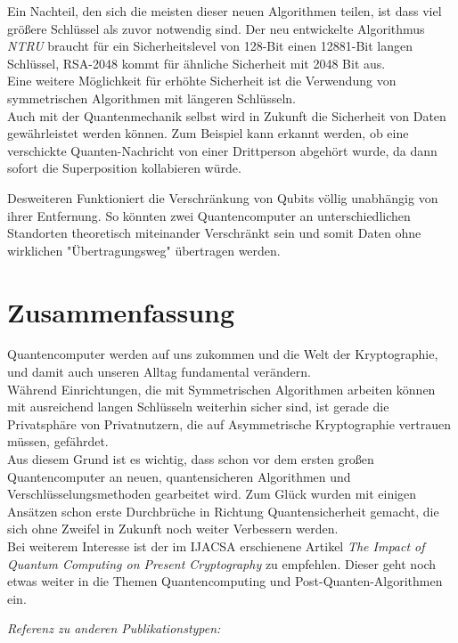 \documentclass[12pt]{article}
\begin{document}
Ein Nachteil, den sich die meisten dieser neuen Algorithmen teilen, ist dass viel größere Schlüssel als zuvor notwendig sind. Der neu entwickelte Algorithmus \textit{NTRU} braucht für ein Sicherheitslevel von 128-Bit einen 12881-Bit langen Schlüssel, RSA-2048 kommt für ähnliche Sicherheit mit 2048 Bit aus. \\
Eine weitere Möglichkeit für erhöhte Sicherheit ist die Verwendung von symmetrischen Algorithmen mit längeren Schlüsseln. \\

Auch mit der Quantenmechanik selbst wird in Zukunft die Sicherheit von Daten gewährleistet werden können. Zum Beispiel kann erkannt werden, ob eine verschickte Quanten-Nachricht von einer Drittperson abgehört wurde, da dann sofort die Superposition kollabieren würde.

Desweiteren Funktioniert die Verschränkung von Qubits völlig unabhängig von ihrer Entfernung. So könnten zwei Quantencomputer an unterschiedlichen Standorten theoretisch miteinander Verschränkt sein und somit Daten ohne wirklichen "Übertragungsweg" übertragen werden. \cite{mavroeidis2018impact}

\clearpage
\section{Zusammenfassung}

Quantencomputer werden auf uns zukommen und die Welt der Kryptographie, und damit auch unseren Alltag fundamental verändern. \\

Während Einrichtungen, die mit Symmetrischen Algorithmen arbeiten können mit ausreichend langen Schlüsseln weiterhin sicher sind, ist gerade die Privatsphäre von Privatnutzern, die auf Asymmetrische Kryptographie vertrauen müssen, gefährdet. \\

Aus diesem Grund ist es wichtig, dass schon vor dem ersten großen Quantencomputer an neuen, quantensicheren Algorithmen und Verschlüsselungsmethoden gearbeitet wird. Zum Glück wurden mit einigen Ansätzen schon erste Durchbrüche in Richtung Quantensicherheit gemacht, die sich ohne Zweifel in Zukunft noch weiter Verbessern werden. \\

Bei weiterem Interesse ist der im IJACSA erschienene Artikel \textit{The Impact of Quantum Computing on Present Cryptography} \cite{mavroeidis2018impact} zu empfehlen. Dieser geht noch etwas weiter in die Themen Quantencomputing und Post-Quanten-Algorithmen ein. 

\textit{Referenz zu anderen Publikationstypen:} \cite{conferencePaper} \cite{techReport}

\clearpage


\end{document}
